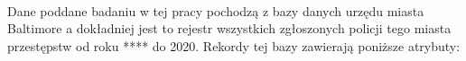 \paragraph{}
Dane poddane badaniu w tej pracy pochodzą z bazy danych urzędu miasta Baltimore a dokładniej jest to rejestr wszystkich zgłoszonych policji tego miasta przestępstw od roku **** do 2020. Rekordy tej bazy zawierają poniższe atrybuty:
